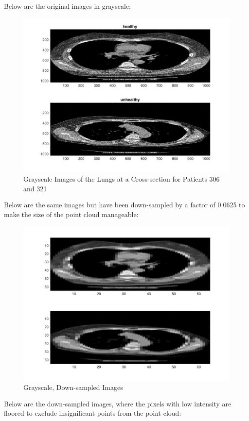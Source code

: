 \documentclass[12pt]{report}
\begin{document}
Below are the original images in grayscale:

\begin{figure}[H]
\centering
	\includegraphics[width=0.8\linewidth]{tS1.jpg}
	\caption{Grayscale Images of the Lungs at a Cross-section for Patients 306 and 321}
\end{figure}

Below are the same images but have been down-sampled by a factor of 0.0625 to make the size of the point cloud manageable:

\begin{figure}[H]
\centering
	\includegraphics[width=0.8\linewidth]{tS3.jpg}
	\caption{Grayscale, Down-sampled Images}
\end{figure}

Below are the down-sampled images, where the pixels with low intensity are floored to exclude insignificant points from the point cloud:
\end{document}
